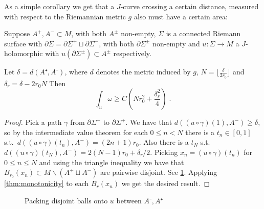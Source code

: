 \documentclass[12pt,a4paper,draft]{scrartcl}
\begin{document}
As a simple corollary we get that a $J$-curve crossing a certain distance, measured with respect to the Riemannian metric $g$ also must have a certain area:

\begin{corollary}
  \label{thm:small_buffer}
  Suppose $A^+, A^- ⊂ M$, with both $A^±$ non-empty, $Σ$ is a connected Riemann surface with $∂Σ = ∂Σ^+ ⊔ ∂Σ^-$, with both $∂Σ^±$ non-empty and $u\colon Σ → M$ a $J$-holomorphic with $u(∂Σ^±) ⊂ A^±$ respectively.
  
  Let $δ=d(A⁺,A⁻)$, where $d$ denotes the metric induced by $g$, $N=\lfloor \frac{δ}{2r_0}\rfloor$ and $δ_r = δ-2r_0 N$
  Then
  \[∫_u ω ≥ C(Nr_0^2+\frac{δ_r^2}{4}) \; .\]
\end{corollary}

\begin{proof}
  Pick a path $γ$ from $∂Σ^-$ to $∂Σ^+$.
  We have that $d((u ∘ γ) (1),A^-) ≥ δ$, so by the intermediate value theorem for each $0 ≤ n < N$ there is a $t_n ∈ [0,1]$ s.t.\ $d((u ∘ γ) (t_n),A^-) = (2n+1)r_0$.
  Also there is a $t_N$ s.t.\ $d((u ∘ γ) (t_N),A^-) = 2(N-1)r_0 + δ_r/2$.
  Picking $x_n = (u ∘ γ)(t_n)$ for $0 ≤ n ≤ N$ and using the triangle inequality we have that $B_{r_0}(x_n) ⊂ M ∖ ( A^+ ⊔ A^-)$ are pairwise disjoint.
  See \cref{fig:small_buffer}.
  Applying \cref{thm:monotonicity} to each $B_r(x_n)$ we get the desired result.
\end{proof}

\begin{figure}
  \centering
  \caption{Packing disjoint balls onto $u$ between $A⁻,A⁺$}
  \label{fig:small_buffer}
\end{figure}
\end{document}
